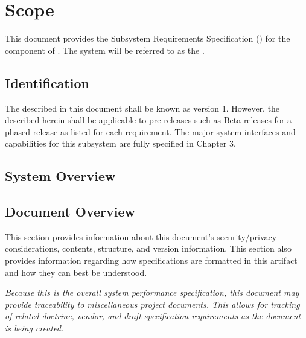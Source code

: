 
\chapter{Scope}
\label{loc:Scope}


This document provides the Subsystem Requirements Specification (\SRS) for the \ThisSubSys component of \ThisSystem. 
The system will be referred to as the \ThisSys.


\section{Identification}
\label{loc:Identification}


The \ThisSystem described in this document shall be known as \ThisSys version 1.
However, the \SRS described herein shall be applicable to pre-releases such as Beta-releases for a phased release as listed for each requirement.
The major system interfaces and capabilities for this subsystem are fully specified in Chapter 3.


\section{System Overview}
\label{loc:SystemOverview}





\newpage
\section{Document Overview}
\label{loc:DocumentOverview}


This section provides information about this document's security/privacy considerations, contents, structure, and version information.
This section also provides information regarding how specifications are formatted in this artifact and how they can best be understood.






{\em 
Because this is the overall system performance specification, this document may provide traceability to miscellaneous project documents.
This allows for tracking of related doctrine, vendor, and draft specification requirements as the document is being created.
}



